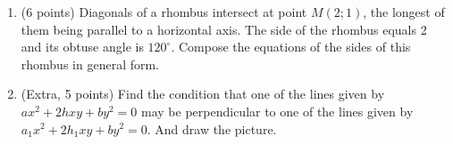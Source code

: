 \documentclass[]{exam}
\begin{document}
\begin{enumerate}
\item (6 points) Diagonals of a rhombus intersect at point $M(2; 1)$, the longest of them being
parallel to a horizontal axis. The side of the rhombus equals 2 and its obtuse angle is $120^\circ$. Compose the equations of the sides of this rhombus in general form.


\item (Extra, 5 points) Find the condition that one of the lines given by $ax^2 + 2hxy + by^2 = 0$ may be perpendicular to one of the lines given by $a_1x^2 + 2h_1xy + by^2 = 0$. And draw the picture.


\end{enumerate}
\end{document}
